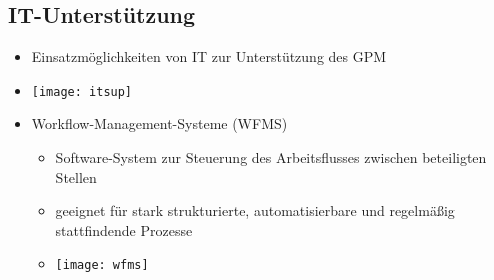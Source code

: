 \subsection{IT-Unterstützung}
\begin{itemize}
\item Einsatzmöglichkeiten von IT zur Unterstützung des GPM
\item[] \texttt{[image: itsup]}
\item Workflow-Management-Systeme (WFMS)
	\begin{itemize}
	\item Software-System zur Steuerung des Arbeitsflusses zwischen beteiligten Stellen
	\item geeignet für stark strukturierte, automatisierbare und regelmäßig stattfindende Prozesse 
	\item[] \texttt{[image: wfms]}
	\end{itemize}
\end{itemize}